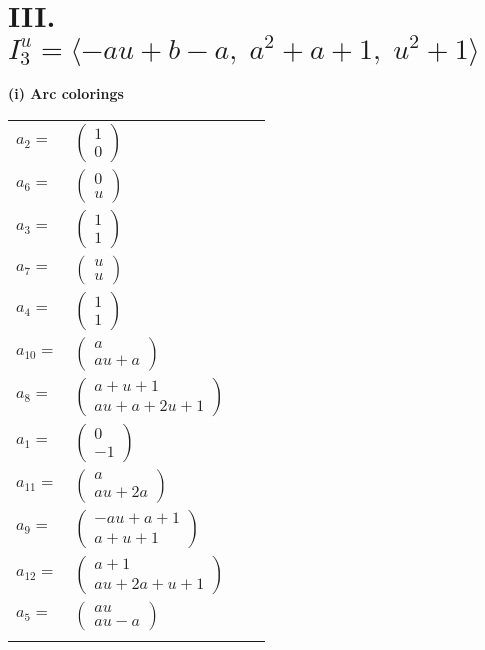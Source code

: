 \documentclass[1p]{elsarticle_modified}
\theoremstyle{definition}
\begin{document}
\centering \section*{III. $I^u_{3}= \langle - a u+b- a,\;a^2+a+1,\;u^2+1 \rangle$}
\flushleft \textbf{(i) Arc colorings}\\
\begin{tabular}{m{7pt} m{180pt} m{7pt} m{180pt} }
\flushright $a_{2}=$&$\begin{pmatrix}1\\0\end{pmatrix}$ \\
\flushright $a_{6}=$&$\begin{pmatrix}0\\u\end{pmatrix}$ \\
\flushright $a_{3}=$&$\begin{pmatrix}1\\1\end{pmatrix}$ \\
\flushright $a_{7}=$&$\begin{pmatrix}u\\u\end{pmatrix}$ \\
\flushright $a_{4}=$&$\begin{pmatrix}1\\1\end{pmatrix}$ \\
\flushright $a_{10}=$&$\begin{pmatrix}a\\a u+a\end{pmatrix}$ \\
\flushright $a_{8}=$&$\begin{pmatrix}a+u+1\\a u+a+2 u+1\end{pmatrix}$ \\
\flushright $a_{1}=$&$\begin{pmatrix}0\\-1\end{pmatrix}$ \\
\flushright $a_{11}=$&$\begin{pmatrix}a\\a u+2 a\end{pmatrix}$ \\
\flushright $a_{9}=$&$\begin{pmatrix}- a u+a+1\\a+u+1\end{pmatrix}$ \\
\flushright $a_{12}=$&$\begin{pmatrix}a+1\\a u+2 a+u+1\end{pmatrix}$ \\
\flushright $a_{5}=$&$\begin{pmatrix}a u\\a u- a\end{pmatrix}$\\&\end{tabular}
\end{document}
